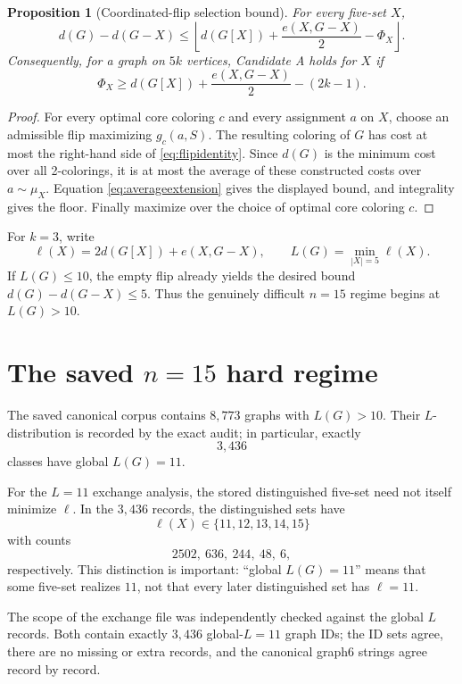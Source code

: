 \documentclass[11pt]{article}
\newtheorem{proposition}{Proposition}
\newcommand{\dd}{d}
\begin{document}
\begin{proposition}[Coordinated-flip selection bound]
For every five-set $X$,
\begin{equation}
\dd(G)-\dd(G-X)
\le
\left\lfloor
\dd(G[X])+\frac{e(X,G-X)}2-\Phi_X
\right\rfloor.
\label{eq:selection}
\end{equation}
Consequently, for a graph on $5k$ vertices, Candidate A holds for $X$ if
\[
\Phi_X\ge
\dd(G[X])+\frac{e(X,G-X)}2-(2k-1).
\]
\end{proposition}

\begin{proof}
For every optimal core coloring $c$ and every assignment $a$ on $X$,
choose an admissible flip maximizing $g_c(a,S)$.  The resulting coloring
of $G$ has cost at most the right-hand side of
\eqref{eq:flipidentity}.  Since $\dd(G)$ is the minimum cost over all
2-colorings, it is at most the average of these constructed costs over
$a\sim\mu_X$.  Equation \eqref{eq:averageextension} gives the displayed
bound, and integrality gives the floor.  Finally maximize over the choice
of optimal core coloring $c$.
\end{proof}

For $k=3$, write
\[
\ell(X)=2\dd(G[X])+e(X,G-X),
\qquad
L(G)=\min_{|X|=5}\ell(X).
\]
If $L(G)\le10$, the empty flip already yields the desired bound
$\dd(G)-\dd(G-X)\le5$.  Thus the genuinely difficult $n=15$ regime begins
at $L(G)>10$.

\section{The saved $n=15$ hard regime}
\label{sec:hard}

The saved canonical corpus contains $8{,}773$ graphs with $L(G)>10$.
Their $L$-distribution is recorded by the exact audit; in particular,
exactly
\[
3{,}436
\]
classes have global $L(G)=11$.

For the $L=11$ exchange analysis, the stored distinguished five-set need
not itself minimize $\ell$.  In the $3{,}436$ records, the distinguished
sets have
\[
\ell(X)\in\{11,12,13,14,15\}
\]
with counts
\[
2502,\ 636,\ 244,\ 48,\ 6,
\]
respectively.  This distinction is important: ``global $L(G)=11$'' means
that some five-set realizes $11$, not that every later distinguished set
has $\ell=11$.

The scope of the exchange file was independently checked against the
global $L$ records.  Both contain exactly $3{,}436$ global-$L=11$ graph
IDs; the ID sets agree, there are no missing or extra records, and the
canonical graph6 strings agree record by record.
\end{document}
